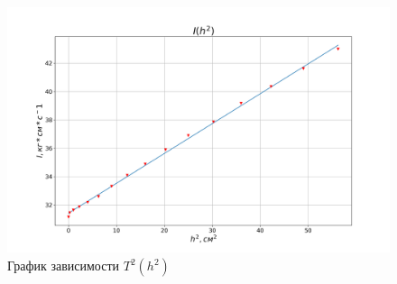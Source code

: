 \documentclass[a4paper, 12pt]{article}
\begin{document}
    \newpage
    \begin{figure}
        \includegraphics[scale=0.66]{plot.png}
        \caption{График зависимости $T^2(h^2)$}
    \end{figure}
    \newpage




\end{document}

